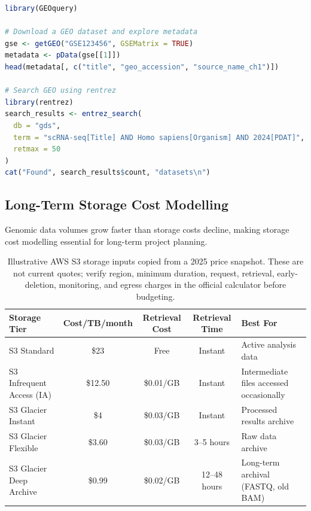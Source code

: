 \begin{lstlisting}[language=R,caption={Programmatic GEO search with the GEOquery R package.},label=lst:geo-search]
library(GEOquery)

# Download a GEO dataset and explore metadata
gse <- getGEO("GSE123456", GSEMatrix = TRUE)
metadata <- pData(gse[[1]])
head(metadata[, c("title", "geo_accession", "source_name_ch1")])

# Search GEO using rentrez
library(rentrez)
search_results <- entrez_search(
  db = "gds",
  term = "scRNA-seq[Title] AND Homo sapiens[Organism] AND 2024[PDAT]",
  retmax = 50
)
cat("Found", search_results$count, "datasets\n")
\end{lstlisting}

\subsection{Long-Term Storage Cost Modelling}
\label{subsec:datastandards:storagecost}

Genomic data volumes grow faster than storage costs decline, making storage cost modelling essential for long-term project planning.

\begin{table}[htbp]
\centering
\caption{Illustrative AWS S3 storage inputs copied from a 2025 price snapshot. These are not current quotes; verify region, minimum duration, request, retrieval, early-deletion, monitoring, and egress charges in the official calculator before budgeting.}
\label{tab:s3-tiers}
\small
\renewcommand{\arraystretch}{1.3}
\begin{tabularx}{\textwidth}{@{}l c c c X@{}}
\toprule
\textbf{Storage Tier} & \textbf{Cost/TB/month} & \textbf{Retrieval Cost} & \textbf{Retrieval Time} & \textbf{Best For} \\
\midrule
S3 Standard & \$23 & Free & Instant & Active analysis data \\
\addlinespace
S3 Infrequent Access (IA) & \$12.50 & \$0.01/GB & Instant & Intermediate files accessed occasionally \\
\addlinespace
S3 Glacier Instant & \$4 & \$0.03/GB & Instant & Processed results archive \\
\addlinespace
S3 Glacier Flexible & \$3.60 & \$0.03/GB & 3--5 hours & Raw data archive \\
\addlinespace
S3 Glacier Deep Archive & \$0.99 & \$0.02/GB & 12--48 hours & Long-term archival (FASTQ, old BAM) \\
\bottomrule
\end{tabularx}
\end{table}

